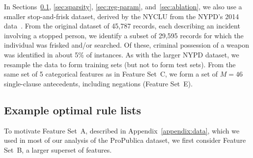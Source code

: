 In Sections~\ref{sec:examples}, \ref{sec:sparsity}, \ref{sec:reg-param}, and~\ref{sec:ablation},
we also use a smaller stop-and-frisk dataset,
derived by the NYCLU from the NYPD's 2014 data~\citep{nyclu:2014}.
%
From the original dataset of 45,787 records, each describing an incident involving
a stopped person, we identify a subset of 29,595 records for which the individual
was frisked and/or searched.
%
Of these, criminal possession of a weapon was identified in about 5\% of instances.
%
As with the larger NYPD dataset, we resample the data to form training sets
(but not to form test sets).
%
From the same set of 5 categorical features as in Feature Set~C, we form a set of ${M=46}$
single-clause antecedents, including negations (Feature Set~E).

\subsection{Example optimal rule lists}
\label{sec:examples}

To motivate Feature Set~A, described in Appendix~\ref{appendix:data},
which we used in most of our analysis of the ProPublica dataset,
we first consider Feature Set~B, a larger superset of features.

